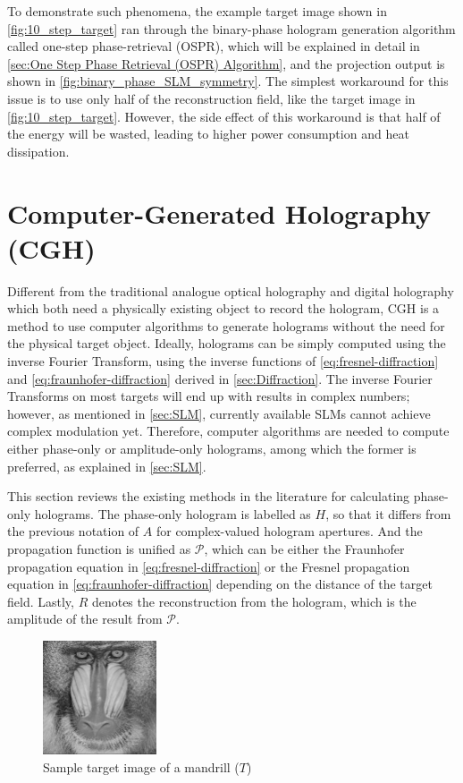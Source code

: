To demonstrate such phenomena, the example target image shown in \cref{fig:10_step_target} ran through the binary-phase hologram generation algorithm called one-step phase-retrieval (OSPR), which will be explained in detail in \cref{sec:One Step Phase Retrieval (OSPR) Algorithm}, and the projection output is shown in \cref{fig:binary_phase_SLM_symmetry}. The simplest workaround for this issue is to use only half of the reconstruction field, like the target image in \cref{fig:10_step_target}. However, the side effect of this workaround is that half of the energy will be wasted, leading to higher power consumption and heat dissipation.



\newpage
\section{Computer-Generated Holography (CGH)}\label{sec:cgh}
Different from the traditional analogue optical holography and digital holography which both need a physically existing object to record the hologram, CGH is a method to use computer algorithms to generate holograms without the need for the physical target object. Ideally, holograms can be simply computed using the inverse Fourier Transform, using the inverse functions of \cref{eq:fresnel-diffraction} and \cref{eq:fraunhofer-diffraction} derived in \cref{sec:Diffraction}. The inverse Fourier Transforms on most targets will end up with results in complex numbers; however, as mentioned in \cref{sec:SLM}, currently available SLMs cannot achieve complex modulation yet. Therefore, computer algorithms are needed to compute either phase-only or amplitude-only holograms, among which the former is preferred, as explained in \cref{sec:SLM}.

This section reviews the existing methods in the literature for calculating phase-only holograms. The phase-only hologram is labelled as $H$, so that it differs from the previous notation of $A$ for complex-valued hologram apertures. And the propagation function is unified as $\mathcal{P}$, which can be either the Fraunhofer propagation equation in \cref{eq:fresnel-diffraction} or the Fresnel propagation equation in \cref{eq:fraunhofer-diffraction} depending on the distance of the target field. Lastly, $R$ denotes the reconstruction from the hologram, which is the amplitude of the result from $\mathcal{P}$.

\begin{figure}[H]
  \centering
  \includegraphics[width=0.3\textwidth]{mandrill.png}
  \caption{Sample target image of a mandrill ($T$) \cite{MANDRILL_REF}}\label{fig:mandrill.png}
\end{figure}

